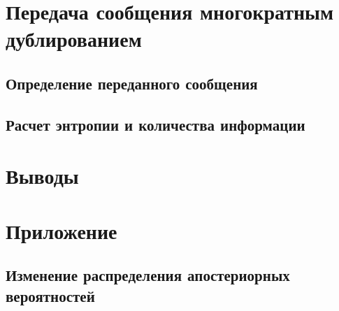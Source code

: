 \section{Передача сообщения многократным дублированием}

\subsection{Определение переданного сообщения}

\subsection{Расчет энтропии и количества информации}

\section{Выводы}

\section*{Приложение}

\subsection*{Изменение распределения апостериорных вероятностей}



